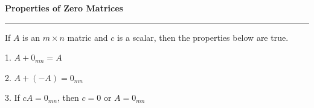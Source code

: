 \nopagenumbers
{\bf Properties of Zero Matrices}
\vskip 1mm
\hrule

\vskip 6pt

If $A$ is an $m\times n$ matric and $c$ is a scalar, then the properties below are true.

\vskip 10pt
1. $A+0_{mn}=A$

\vskip 6pt
2. $A+(-A)=0_{mn}$

\vskip 6pt
3. If $cA=0_{mn}$, then $c=0$ or $A=0_{mn}$

\vfill\eject
\bye
